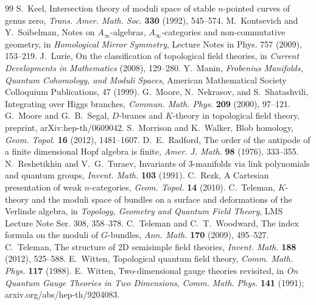 \begin{thebibliography}{99}
 S.~Keel, Intersection theory of moduli space of stable $n$-pointed
curves of genus zero, \emph{Trans. Amer. Math. Soc.} \textbf{330} (1992), 545--574.
 M.~Kontsevich and Y.~Soibelman, Notes on $A_\infty$-algebras,
$A_\infty$-categories and non-commutative geometry, in \emph{Homological Mirror
Symmetry}, Lecture Notes in Phys. 757 (2009), 153--219.
 J.~Lurie, On the classification of topological field theories, in
\emph{Current Developments in Mathematics} (2008), 129--280.
 Y.~Manin, \emph{Frobenius Manifolds, Quantum Cohomology, and Moduli
Spaces}, American Mathematical Society Colloquium Publications, 47 (1999).
 G.~Moore, N.~Nekrasov, and S.~Shatashvili, Integrating over Higgs
branches, \emph{Commun. Math. Phys.} \textbf{209} (2000), 97--121.
 G.~Moore and G.~B.~Segal, $D$-branes and $K$-theory in
topological field theory, preprint, arXiv:hep-th/0609042.
 S.~Morrison and K.~Walker, Blob homology, \emph{Geom. Topol.}
\textbf{16} (2012), 1481--1607.
 D.~E.~Radford, The order of the antipode of a finite dimensional
Hopf algebra is finite, \emph{Amer. J. Math.} \textbf{98} (1976), 333--355.
 N.~Reshetikhin and V.~G.~Turaev, Invariants of 3-manifolds via
link polynomials and quantum groups, \emph{Invent. Math.} \textbf{103} (1991).
 C.~Rezk, A Cartesian presentation of weak $n$-categories,
\emph{Geom. Topol.} \textbf{14} (2010).
 C.~Teleman, $K$-theory and the moduli space of bundles on a surface
and deformations of the Verlinde algebra, in \emph{Topology, Geometry and Quantum
Field Theory}, LMS Lecture Note Ser. 308, 358--378.
 C.~Teleman and C.~T.~Woodward, The index formula on the
moduli of $G$-bundles, \emph{Ann. Math.} \textbf{170} (2009), 495--527.
 C.~Teleman, The structure of 2D semisimple field theories,
\emph{Invent. Math.} \textbf{188} (2012), 525--588.
 E.~Witten, Topological quantum field theory, \emph{Comm. Math.
Phys.} \textbf{117} (1988).
 E.~Witten, Two-dimensional gauge theories revisited, in
\emph{On Quantum Gauge Theories in Two Dimensions}, \emph{Comm. Math. Phys.}
\textbf{141} (1991); arxiv.org/abs/hep-th/9204083.
\end{thebibliography}

